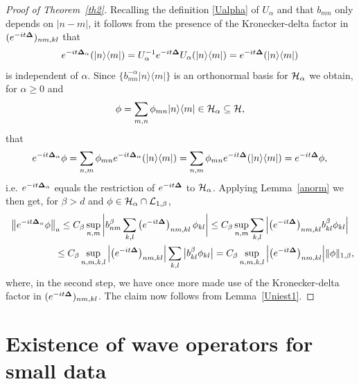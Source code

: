 \documentclass[11pt]{article}
\begin{document}
\begin{proof}[Proof of Theorem~\ref{th2}]
Recalling the def\/inition \eqref{Ualpha} of $U_\alpha$ and that
$b_{mn}$ only depends on $|n-m|$, it follows from the presence of the
Kronecker-delta factor in $(e^{-it{\bf{\Delta}}})_{nm,kl}$ that
\[
e^{-it{\bf{\Delta}}_\alpha}(|n\rangle\langle m|) = U_\alpha^{-1}
e^{-it{\bf{\Delta}}}U_\alpha(|n\rangle\langle m|) = e^{-it{\bf{\Delta}}}(|n\rangle\langle m|)
\]
is independent of $\alpha$. Since
$\{b_{mn}^{-\alpha}|n\rangle\langle m|\}$ is an orthonormal basis
for ${\cal H}_\alpha$ we obtain, for $\alpha\geq 0$ and
\[
\phi =
\sum_{m,n}\phi_{mn}|n\rangle\langle m| \in {\cal H}_\alpha\subseteq
{\cal H} ,
\]
that
\[
e^{-it{\bf{\Delta}}_\alpha}\phi =
\sum_{n,m}\phi_{mn}e^{-it{\bf{\Delta}}_\alpha}(|n\rangle\langle m|) =
\sum_{n,m}\phi_{mn}e^{-it{\bf{\Delta}}}(|n\rangle\langle m|) = e^{-it{\bf{\Delta}}}\phi ,
\]
i.e. $e^{-it{\bf{\Delta}}_\alpha}$ equals the restriction of $e^{-it{\bf{\Delta}}}$
to ${\cal H}_\alpha$.
Applying  Lemma~\ref{anorm} we then get, for $\beta>d$ and
$\phi\in {\cal H}_\alpha\cap {\cal L}_{1,\beta}$,
\begin{gather*}
\big\Vert e^{-it{\bf{\Delta}}_\alpha}\phi\big\Vert_a
 \leq
 C_\beta \sup_{n,m}\bigg|b_{nm}^{\beta}
\sum_{k,l}\big(e^{-it{\bf{\Delta}}}\big)_{nm,kl}\,\phi_{kl}\bigg|
 \leq C_\beta \sup_{n,m}\sum_{k,l}\Big|
\big(e^{-it{\bf{\Delta}}}\big)_{nm,kl} b_{kl}^{\beta} \phi_{kl}\Big|\\
\phantom{\big\Vert e^{-it{\bf{\Delta}}_\alpha}\phi\big\Vert_a}{}
\leq
C_\beta \sup_{n,m,k,l}\Big|\big(e^{-it{\bf{\Delta}}}\big)_{nm,kl}\Big| \sum_{k,l}\big|b_{kl}^{\beta} \phi_{kl}\big|
= C_\beta \sup_{n,m,k,l}\Big|\big(e^{-it{\bf{\Delta}}}\big)_{nm,kl}\Big|
\Vert\phi\Vert_{1,\beta} ,
\end{gather*}
where, in the second step, we have once more made use of the
Kronecker-delta factor in $(e^{-it{\bf{\Delta}}})_{nm,kl}$.
The claim now follows from Lemma~\ref{Uniest1}.
\end{proof}
\setcounter{section}{4}
\setcounter{subsection}{0}
\setcounter{subsubsection}{0}
\setcounter{equation}{32}
\section{Existence of wave operators for small data}
\label{secth3}
\end{document}
